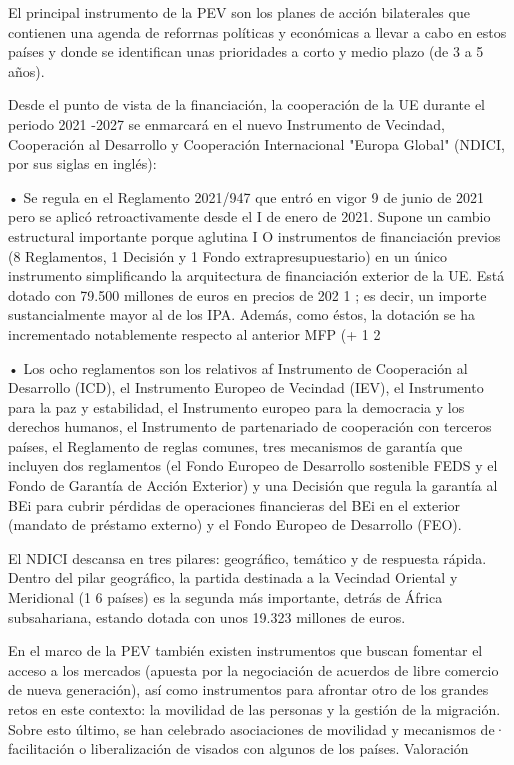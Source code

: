 \documentclass[10pt,a4paper]{article}
\begin{document}
El principal instrumento de la PEV son los planes de acción bilaterales que contienen una agenda de reforrnas políticas y económicas a llevar a cabo en estos países y donde se identifican unas prioridades a corto y medio plazo (de 3 a 5 años). 

Desde el punto de vista de la financiación, la cooperación de la UE durante el periodo 2021 -2027 se enmarcará en el nuevo Instrumento de Vecindad, Cooperación al Desarrollo y Cooperación Internacional "Europa Global" (NDICI, por sus siglas en inglés):

• Se regula en el Reglamento 2021/947 que entró en vigor 9 de junio de 2021 pero se aplicó retroactivamente desde el I de enero de 2021. Supone un cambio estructural importante porque aglutina I O instrumentos de financiación previos (8 Reglamentos, 1 Decisión y 1 Fondo extrapresupuestario) en un único instrumento simplificando la arquitectura de financiación exterior de la UE. Está dotado con 79.500 millones de euros en precios de 202 1 ; es decir, un importe sustancialmente mayor al de los IPA. Además, como éstos, la dotación se ha incrementado notablemente respecto al anterior MFP (+ 1 2%

• Los ocho reglamentos son los relativos af Instrumento de Cooperación al Desarrollo (ICD), el Instrumento Europeo de Vecindad (IEV), el Instrumento para la paz y estabilidad, el Instrumento europeo para la democracia y los derechos humanos, el Instrumento de partenariado de cooperación con terceros países, el Reglamento de reglas comunes, tres mecanismos de garantía que incluyen dos reglamentos (el Fondo Europeo de Desarrollo sostenible FEDS y el Fondo de Garantía de Acción Exterior) y una Decisión que regula la garantía al BEi para cubrir pérdidas de operaciones financieras del BEi en el exterior (mandato de préstamo externo) y el Fondo Europeo de Desarrollo (FEO).

El NDICI descansa en tres pilares: geográfico, temático y de respuesta rápida. Dentro del pilar geográfico, la partida destinada a la Vecindad Oriental y Meridional (1 6 países) es la segunda más importante, detrás de África subsahariana, estando dotada con unos 19.323 millones de euros.

En el marco de la PEV también existen instrumentos que buscan fomentar el acceso a los mercados (apuesta por la negociación de acuerdos de libre comercio de nueva generación), así como instrumentos para afrontar otro de los grandes retos en este contexto: la movilidad de las personas y la gestión de la migración. Sobre esto último, se han celebrado asociaciones de movilidad y mecanismos de· facilitación o liberalización de visados con algunos de los países. Valoración
\end{document}
